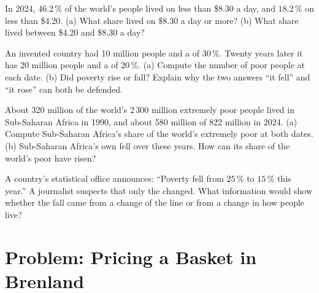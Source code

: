 \begin{exercise}[$\star\star$]\label{exo:g6:poverty:9}
In 2024, $46.2\,\%$ of the world's people lived on less than \$8.30 a day, and
$18.2\,\%$ on less than \$4.20. (a) What share lived on \$8.30 a day or more?
(b) What share lived between \$4.20 and \$8.30 a day?
\end{exercise}

\begin{exercise}[$\star\star\star$]\label{exo:g6:poverty:10}
An invented country had 10 million people and a  of $30\,\%$. Twenty
years later it has 20 million people and a  of $20\,\%$. (a) Compute
the number of poor people at each date. (b) Did poverty rise or fall? Explain
why the two answers ``it fell'' and ``it rose'' can both be defended.
\end{exercise}

\begin{exercise}[$\star\star\star$]\label{exo:g6:poverty:11}
About 320 million of the world's 2\,300 million extremely poor people lived in
Sub-Saharan Africa in 1990, and about 580 million of 822 million in 2024.
(a) Compute Sub-Saharan Africa's share of the world's extremely poor at both
dates. (b) Sub-Saharan Africa's own  fell over these years. How can
its share of the world's poor have risen?
\end{exercise}

\begin{exercise}[$\star\star\star$]\label{exo:g6:poverty:12}
A country's statistical office announces: ``Poverty fell from $25\,\%$ to $15\,\%$
this year.'' A journalist suspects that only the  changed. What
information would show whether the fall came from a change of the line or from
a change in how people live?
\end{exercise}

\section{Problem: Pricing a Basket in Brenland}

